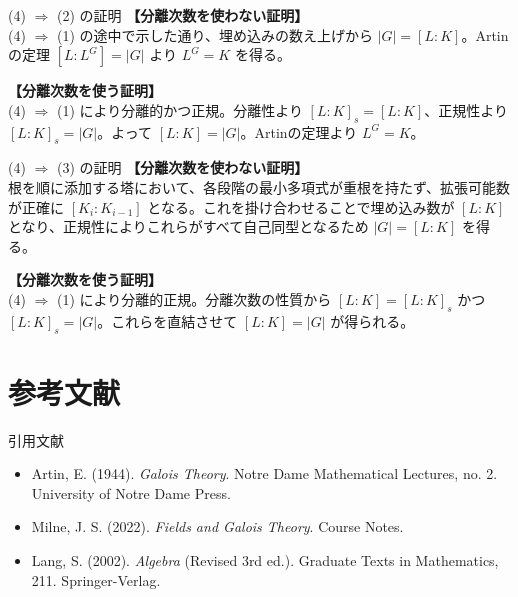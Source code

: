 \documentclass[11pt,dvipsnames]{beamer}
\begin{document}
\begin{frame}[allowframebreaks]{(4) $\Rightarrow$ (2) の証明}
    \textbf{【分離次数を使わない証明】}\\
    (4) $\Rightarrow$ (1) の途中で示した通り、埋め込みの数え上げから $|G| = [L:K]$。Artinの定理 $[L:L^G] = |G|$ より $L^G = K$ を得る。

    \vspace{1em}
    \textbf{【分離次数を使う証明】}\\
    (4) $\Rightarrow$ (1) により分離的かつ正規。分離性より $[L:K]_s = [L:K]$、正規性より $[L:K]_s = |G|$。よって $[L:K] = |G|$。Artinの定理より $L^G = K$。
\end{frame}

\begin{frame}[allowframebreaks]{(4) $\Rightarrow$ (3) の証明}
    \textbf{【分離次数を使わない証明】}\\
    根を順に添加する塔において、各段階の最小多項式が重根を持たず、拡張可能数が正確に $[K_i:K_{i-1}]$ となる。これを掛け合わせることで埋め込み数が $[L:K]$ となり、正規性によりこれらがすべて自己同型となるため $|G| = [L:K]$ を得る。

    \vspace{1em}
    \textbf{【分離次数を使う証明】}\\
    (4) $\Rightarrow$ (1) により分離的正規。分離次数の性質から $[L:K] = [L:K]_s$ かつ $[L:K]_s = |G|$。これらを直結させて $[L:K] = |G|$ が得られる。
\end{frame}

\section{参考文献}

\begin{frame}{引用文献}
    \begin{itemize}
        \item Artin, E. (1944). \textit{Galois Theory}. Notre Dame Mathematical Lectures, no. 2. University of Notre Dame Press.
        \item Milne, J. S. (2022). \textit{Fields and Galois Theory}. Course Notes.
        \item Lang, S. (2002). \textit{Algebra} (Revised 3rd ed.). Graduate Texts in Mathematics, 211. Springer-Verlag.
    \end{itemize}
\end{frame}
\end{document}
